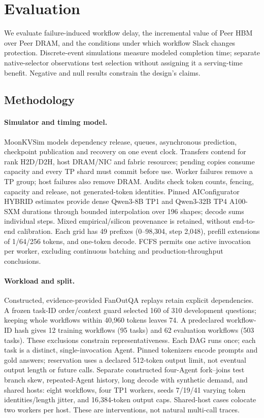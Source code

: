 \section{Evaluation}
\label{sec:evaluation}

We evaluate failure-induced workflow delay, the incremental value of Peer HBM
over Peer DRAM, and the conditions under which workflow Slack changes
protection. Discrete-event simulations measure modeled completion time;
separate native-selector observations test selection without assigning it a
serving-time benefit. Negative and null results constrain the design's claims.

\subsection{Methodology}
\label{sec:eval-method}

\paragraph{Simulator and timing model.}
MoonKVSim models dependency release, queues, asynchronous prediction,
checkpoint publication and recovery on one event clock. Transfers contend for
rank H2D/D2H, host DRAM/NIC and fabric resources; pending copies consume capacity
and every TP shard must commit before use. Worker failures remove a TP group;
host failures also remove DRAM. Audits check token counts, fencing, capacity
and release, not generated-token identities.
Pinned AIConfigurator HYBRID estimates\cite{eval2026aiconfigurator} provide
dense Qwen3-8B TP1 and Qwen3-32B TP4 A100-SXM durations through bounded
interpolation over 196 shapes; decode sums individual steps. Mixed
empirical/silicon provenance is retained, without end-to-end calibration.
Each grid has 49 prefixes (0--98,304, step 2,048), prefill extensions of
1/64/256 tokens, and one-token decode.
FCFS permits one active invocation per worker, excluding continuous batching
and production-throughput conclusions.

\paragraph{Workload and split.}
Constructed, evidence-provided FanOutQA replays\cite{eval2024fanoutqa} retain
explicit dependencies. A frozen task-ID order/context guard selected 160 of
310 development questions; keeping whole workflows within 40,960 tokens leaves
74. A predeclared workflow-ID hash gives 12 training workflows (95 tasks) and
62 evaluation workflows (503 tasks). These exclusions constrain
representativeness. Each DAG runs once; each task is a distinct,
single-invocation Agent. Pinned tokenizers encode prompts and gold answers;
reservation uses a declared 512-token output limit, not eventual output length
or future calls.
Separate constructed four-Agent fork--joins test branch skew, repeated-Agent
history, long decode with synthetic demand, and shared hosts: eight workflows,
four TP1 workers, seeds 7/19/41 varying token identities/length jitter, and
16,384-token output caps. Shared-host cases colocate two workers per host.
These are interventions, not natural multi-call traces.

